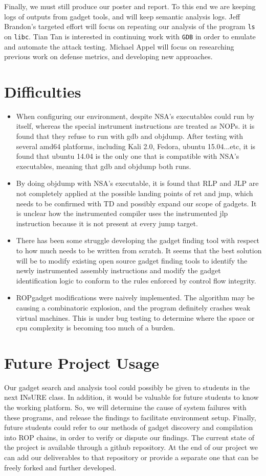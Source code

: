 \documentclass[letterpaper,10pt]{article}
\begin{document}
Finally, we must still produce our poster and report. To this end we are keeping logs of outputs from gadget tools, and will keep semantic analysis logs. Jeff Brandon's targeted effort will focus on repeating our analysis of the program \texttt{ls} on \texttt{libc}. Tian Tan is interested in continuing work with \texttt{GDB} in order to emulate and automate the attack testing. Michael Appel will focus on researching previous work on defense metrics, and developing new approaches.

\section{Difficulties}
\begin{itemize}
	\item When configuring our environment, despite NSA's executables could run by itself, whereas the special instrument instructions are treated as NOPs. it is found that they refuse to run with gdb and objdump. After testing with several amd64 platforms, including Kali 2.0, Fedora, ubuntu 15.04...etc, it is found that ubuntu 14.04 is the only one that is compatible with NSA's executables, meaning that gdb and objdump both runs.
    \item By doing objdump with NSA's executable, it is found that RLP and JLP are not completely applied at the possible landing points of ret and jmp, which needs to be confirmed with TD and possibly expand our scope of gadgets. It is unclear how the instrumented compiler uses the instrumented jlp instruction because it is not present at every jump target.
    \item There has been some struggle developing the gadget finding tool with respect to how much needs to be written from scratch. It seems that the best solution will be to modify existing open source gadget finding tools to identify the newly instrumented assembly instructions and modify the gadget identification logic to conform to the rules enforced by control flow integrity.
    \item ROPgadget modifications were naively implemented. The algorithm may be causing a combinatoric explosion, and the program definitely crashes weak virtual machines. This is under bug testing to determine where the space or cpu complexity is becoming too much of a burden. 
\end{itemize}

\section{Future Project Usage}
Our gadget search and analysis tool could possibly be given to students in the next INsURE class. In addition, it would be valuable for future students to know the working platform. So, we will determine the cause of system failures with these programs, and release the findings to facilitate environment setup. Finally, future students could refer to our methods of gadget discovery and compilation into ROP chains, in order to verify or dispute our findings. The current state of the project is available through a github repository. At the end of our project we can add our deliverables to that repository or provide a separate one that can be freely forked and further developed. 
\end{document}
